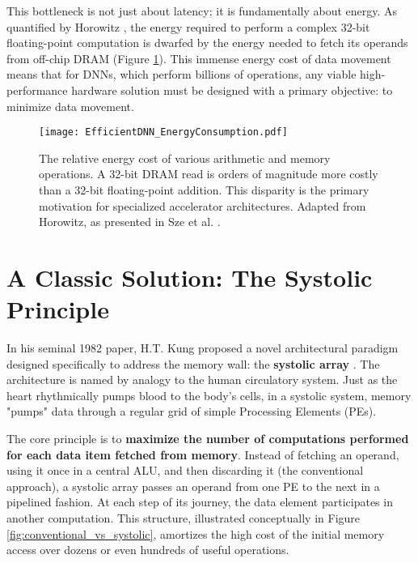 This bottleneck is not just about latency; it is fundamentally about energy. As quantified by Horowitz \cite{horowitz2014energy}, the energy required to perform a complex 32-bit floating-point computation is dwarfed by the energy needed to fetch its operands from off-chip DRAM (Figure \ref{fig:energy_cost}). This immense energy cost of data movement means that for DNNs, which perform billions of operations, any viable high-performance hardware solution must be designed with a primary objective: to minimize data movement.

\begin{figure}[h!]
    \centering
    \texttt{[image: EfficientDNN\_EnergyConsumption.pdf]} 
    \caption[The Relative Energy Cost of Computation vs. Memory Access]{The relative energy cost of various arithmetic and memory operations. A 32-bit DRAM read is orders of magnitude more costly than a 32-bit floating-point addition. This disparity is the primary motivation for specialized accelerator architectures. Adapted from Horowitz, as presented in Sze et al. \cite{sze2020efficient, horowitz2014energy}.}
    \label{fig:energy_cost}
\end{figure}

\section{A Classic Solution: The Systolic Principle}
\label{sec:systolic_principle}

In his seminal 1982 paper, H.T. Kung proposed a novel architectural paradigm designed specifically to address the memory wall: the \textbf{systolic array} \cite{kung1982systolic}. The architecture is named by analogy to the human circulatory system. Just as the heart rhythmically pumps blood to the body's cells, in a systolic system, memory "pumps" data through a regular grid of simple Processing Elements (PEs).

The core principle is to \textbf{maximize the number of computations performed for each data item fetched from memory}. Instead of fetching an operand, using it once in a central ALU, and then discarding it (the conventional approach), a systolic array passes an operand from one PE to the next in a pipelined fashion. At each step of its journey, the data element participates in another computation. This structure, illustrated conceptually in Figure \ref{fig:conventional_vs_systolic}, amortizes the high cost of the initial memory access over dozens or even hundreds of useful operations.

